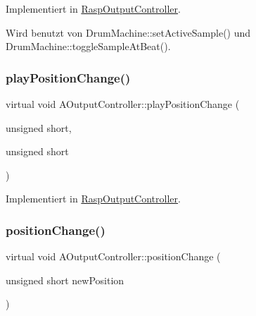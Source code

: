 Implementiert in \hyperlink{class_rasp_output_controller_aa084e570bcf25c75b9389ca63c875f0c}{Rasp\+Output\+Controller}.



Wird benutzt von Drum\+Machine\+::set\+Active\+Sample() und Drum\+Machine\+::toggle\+Sample\+At\+Beat().

\mbox{\label{class_a_output_controller_a15c1300df5606bf7d4838b41a45c31e3}} 
\subsubsection{\texorpdfstring{play\+Position\+Change()}{playPositionChange()}\hspace{0.1cm}{\footnotesize\ttfamily [2/2]}}
{\footnotesize\ttfamily virtual void A\+Output\+Controller\+::play\+Position\+Change (\begin{DoxyParamCaption}\item[{unsigned}]{short,  }\item[{unsigned}]{short }\end{DoxyParamCaption})\hspace{0.3cm}{\ttfamily [pure virtual]}}



Implementiert in \hyperlink{class_rasp_output_controller_a0778395ee8ec044d04fbfcb2f3b2eb04}{Rasp\+Output\+Controller}.

\mbox{\label{class_a_output_controller_a5a818a40e2911411d378032b8b2fb6c8}} 
\subsubsection{\texorpdfstring{position\+Change()}{positionChange()}}
{\footnotesize\ttfamily virtual void A\+Output\+Controller\+::position\+Change (\begin{DoxyParamCaption}\item[{unsigned short}]{new\+Position }\end{DoxyParamCaption})\hspace{0.3cm}{\ttfamily [pure virtual]}}



